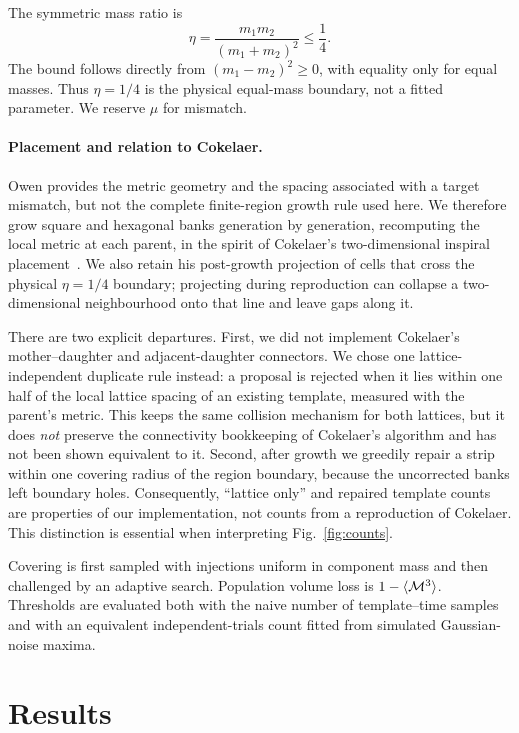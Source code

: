 \documentclass[10pt,a4paper]{article}
\begin{document}
The symmetric mass ratio is
\begin{equation}
 \eta=\frac{m_1m_2}{(m_1+m_2)^2}\leq\frac14.
\end{equation}
The bound follows directly from $(m_1-m_2)^2\geq0$, with equality only for equal masses.
Thus $\eta=1/4$ is the physical equal-mass boundary, not a fitted parameter. We reserve
$\mu$ for mismatch.

\paragraph{Placement and relation to Cokelaer.}
Owen provides the metric geometry and the spacing associated with a target mismatch, but
not the complete finite-region growth rule used here. We therefore grow square and
hexagonal banks generation by generation, recomputing the local metric at each parent, in
the spirit of Cokelaer's two-dimensional inspiral placement~\cite{cokelaer2007}. We also
retain his post-growth projection of cells that cross the physical $\eta=1/4$ boundary;
projecting during reproduction can collapse a two-dimensional neighbourhood onto that
line and leave gaps along it.

There are two explicit departures. First, we did not implement Cokelaer's
mother--daughter and adjacent-daughter connectors. We chose one lattice-independent
duplicate rule instead: a proposal is rejected when it lies within one half of the local
lattice spacing of an existing template, measured with the parent's metric. This keeps
the same collision mechanism for both lattices, but it does \emph{not} preserve the
connectivity bookkeeping of Cokelaer's algorithm and has not been shown equivalent to it.
Second, after growth we greedily repair a strip within one covering radius of the region
boundary, because the uncorrected banks left boundary holes. Consequently, ``lattice
only'' and repaired template counts are properties of our implementation, not counts from
a reproduction of Cokelaer. This distinction is essential when interpreting
Fig.~\ref{fig:counts}.

Covering is first sampled with injections uniform in component mass and then challenged
by an adaptive search. Population volume loss is $1-\langle{\cal M}^3\rangle$. Thresholds
are evaluated both with the naive number of template--time samples and with an equivalent
independent-trials count fitted from simulated Gaussian-noise maxima.

\section{Results}
\end{document}
